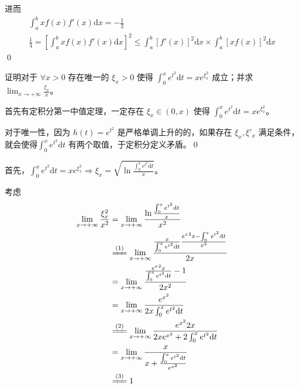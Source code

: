 进而
\begin{gather*}
	\int _{a}^{b} xf( x) f'( x)\mathrm{d} x=-\frac{1}{2}\\
	\frac{1}{4} =\left[\int _{a}^{b} xf( x) f'( x)\mathrm{d} x\right]^{2} \leqslant \int _{a}^{b}[ f'( x)]^{2}\mathrm{d} x\times \int _{a}^{b}[ xf( x)]^{2}\mathrm{d} x
\end{gather*}
\qed 



\begin{ques}
	证明对于 $\displaystyle \forall x >0$ 存在唯一的 $\displaystyle \xi _{x}  >0$ 使得 $\displaystyle \int _{0}^{x} e^{t^{2}}\mathrm{d} t=xe^{\xi _{x}^{2}}$ 成立；并求 $\displaystyle \lim _{x\rightarrow +\infty }\frac{\xi _{x}}{x}$。
\end{ques}



首先有定积分第一中值定理，一定存在 $\displaystyle \xi _{x} \in ( 0,x)$ 使得 $\displaystyle \int _{0}^{x} e^{t^{2}}\mathrm{d} t=xe^{\xi _{x}^{2}}$。

对于唯一性，因为 $\displaystyle h( t) =e^{t^{2}}$ 是严格单调上升的的，如果存在 $\displaystyle \xi _{x} ,\xi '_{x}$ 满足条件，就会使得$\displaystyle \int _{0}^{x} e^{t^{2}}\mathrm{d} t$ 有两个取值，于定积分定义矛盾。\qed 



首先，$\displaystyle \int _{0}^{x} e^{t^{2}}\mathrm{d} t=xe^{\xi _{x}^{2}} \Rightarrow \xi _{x} =\sqrt{\ln\frac{\int _{0}^{x} e^{t^{2}}\mathrm{d} t}{x}}$。

考虑
\begin{equation*}
	\begin{aligned}
		\lim _{x\rightarrow +\infty }\frac{\xi _{x}^{2}}{x^{2}} & =\lim _{x\rightarrow +\infty }\frac{\ln\frac{\int _{0}^{x} e^{t^{2}}\mathrm{d} t}{x}}{x^{2}}\\
		& \xlongequal{( 1)}\lim _{x\rightarrow +\infty }\frac{\frac{x}{\int _{0}^{x} e^{t^{2}}\mathrm{d} t}\frac{e{^{x}}^{2} x-\int _{0}^{x} e^{t^{2}}\mathrm{d} t}{x^{2}}}{2x}\\
		& =\lim _{x\rightarrow +\infty }\frac{\frac{e{^{x}}^{2} x}{\int _{0}^{x} e^{t^{2}}\mathrm{d} t} -1}{2x^{2}}\\
		& =\lim _{x\rightarrow +\infty }\frac{e^{x^{2}}}{2x\int _{0}^{x} e^{t^{2}}\mathrm{d} t}\\
		& \xlongequal{( 2)}\lim _{x\rightarrow +\infty }\frac{e^{x^{2}} 2x}{2xe^{x^{2}} +2\int _{0}^{x} e^{t^{2}}\mathrm{d} t}\\
		& =\lim _{x\rightarrow +\infty }\frac{x}{x+\frac{\int _{0}^{x} e^{t^{2}}\mathrm{d} t}{e^{x^{2}}}}\\
		& \xlongequal{( 3)} 1
	\end{aligned}
\end{equation*}


